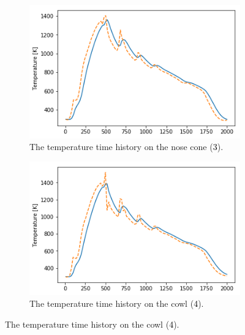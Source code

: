 \begin{figure}[!ht]
\begin{subfigure}{.5\textwidth}
	\end{subfigure}
	\begin{subfigure}{.5\textwidth}
		\centering
		\includegraphics[width=0.99\linewidth]{figures/A1_uncertainty-analysis/TPos1Return}
		\caption{The temperature time history on the nose cone (\textcolor{black}{3}).}
		
	\end{subfigure}
	\begin{subfigure}{.5\textwidth}
		\centering
		\includegraphics[width=0.99\linewidth]{figures/A1_uncertainty-analysis/TPos2Return}
		\caption{The temperature time history on the cowl (\textcolor{black}{4}).}
		

\end{subfigure}
\end{figure}
